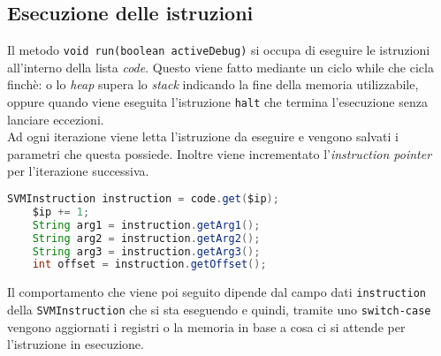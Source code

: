 \documentclass[../main.tex]{subfiles}
\begin{document}
\subsection{Esecuzione delle istruzioni}
Il metodo \verb|void run(boolean activeDebug)| si occupa di eseguire le istruzioni all'interno della lista \textit{code}. Questo viene fatto mediante un ciclo while che cicla finch\`e: o lo \textit{heap} supera lo \textit{stack} indicando la fine della memoria utilizzabile, oppure quando viene eseguita l'istruzione \verb|halt| che termina l'esecuzione senza lanciare eccezioni.\\
Ad ogni iterazione viene letta l'istruzione da eseguire e vengono salvati i parametri che questa possiede. Inoltre viene incrementato l'\textit{instruction pointer} per l'iterazione successiva.
\begin{lstlisting}[language=Java]
    SVMInstruction instruction = code.get($ip);
    $ip += 1;
    String arg1 = instruction.getArg1();
    String arg2 = instruction.getArg2();
    String arg3 = instruction.getArg3();
    int offset = instruction.getOffset();
\end{lstlisting}
Il comportamento che viene poi seguito dipende dal campo dati \verb|instruction| della \verb|SVMInstruction| che si sta eseguendo e quindi, tramite uno \verb|switch-case| vengono aggiornati i registri o la memoria in base a cosa ci si attende per l'istruzione in esecuzione.
\end{document}
